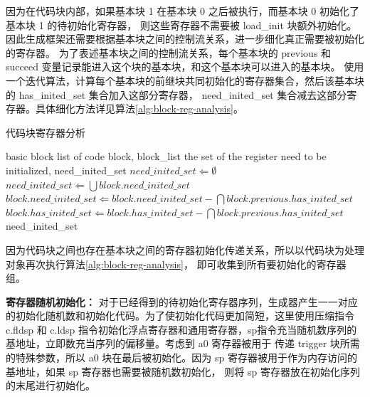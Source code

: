 因为在代码块内部，如果基本块 1 在基本块 0 之后被执行，而基本块 0 初始化了基本块 1 的待初始化寄存器，
则这些寄存器不需要被 load\_init 块额外初始化。因此生成框架还需要根据基本块之间的控制流关系，进一步细化真正需要被初始化的寄存器。
为了表述基本块之间的控制流关系，每个基本块的 previous 和 succeed 变量记录能进入这个块的基本块，和这个基本块可以进入的基本块。
使用一个迭代算法，计算每个基本块的前继块共同初始化的寄存器集合，然后该基本块的 has\_inited\_set 集合加入这部分寄存器，
need\_inited\_set 集合减去这部分寄存器。具体细化方法详见算法\ref{alg:block-reg-analysis}。\par

\begin{algorithm}[!h]
    
    \caption{代码块寄存器分析}
    \label{alg:block-reg-analysis}
    \renewcommand{\algorithmicrequire}{\textbf{Input:}}
    \renewcommand{\algorithmicensure}{\textbf{Output:}}
    
    \begin{algorithmic}[1]
        \REQUIRE basic block list of code block, block\_list    %
        \ENSURE  the set of the register need to be initialized, need\_inited\_set  %
        \STATE $need\_inited\_set \Leftarrow \emptyset$
            \STATE $need\_inited\_set \Leftarrow \bigcup block.need\_inited\_set$
                \STATE $block.need\_inited\_set \Leftarrow block.need\_inited\_set - \bigcap block.previous.has\_inited\_set$
                \STATE $block.has\_inited\_set \Leftarrow block.has\_inited\_set - \bigcap block.previous.has\_inited\_set$
            \ENDFOR
        \ENDWHILE
        \RETURN need\_inited\_set
    \end{algorithmic}
\end{algorithm}

因为代码块之间也存在基本块之间的寄存器初始化传递关系，所以以代码块为处理对象再次执行算法\ref{alg:block-reg-analysis}，
即可收集到所有要初始化的寄存器组。\par

\textbf{寄存器随机初始化：}
对于已经得到的待初始化寄存器序列，生成器产生一一对应的初始化随机数和初始化代码。为了使初始化代码更加简短，这里使用压缩指令
c.fldsp 和 c.ldsp 指令初始化浮点寄存器和通用寄存器，sp指令充当随机数序列的基地址，立即数充当序列的偏移量。考虑到 a0 寄存器被用于
传递 trigger 块所需的特殊参数，所以 a0 块在最后被初始化。因为 sp 寄存器被用于作为内存访问的基地址，如果 sp 寄存器也需要被随机数初始化，
则将 sp 寄存器放在初始化序列的末尾进行初始化。\par

